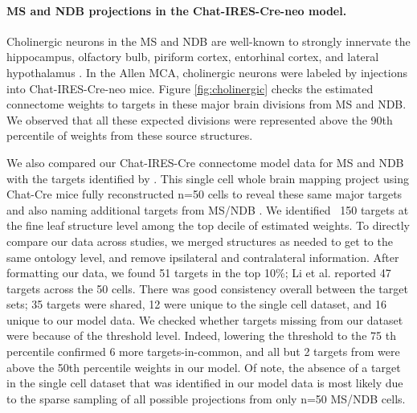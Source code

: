 \paragraph{MS and NDB projections in the Chat-IRES-Cre-neo model.}

Cholinergic neurons in the MS and NDB are well-known to strongly innervate the hippocampus, olfactory bulb, piriform cortex, entorhinal cortex, and lateral hypothalamus \citep{Zaborszky2015-fm, Watson2012TheMN}.
In the Allen MCA, cholinergic neurons were labeled by injections into Chat-IRES-Cre-neo mice.
Figure \ref{fig:cholinergic} checks the estimated connectome weights to targets in these major brain divisions from MS and NDB.
We observed that all these expected divisions were represented above the 90th percentile of weights from these source structures.

We also compared our Chat-IRES-Cre connectome model data for MS and NDB with the targets identified by  \citet{Li2018-nu}.
This single cell whole brain mapping project using Chat-Cre mice fully reconstructed n=50 cells to reveal these same major targets and also naming additional targets from MS/NDB \citep{Li2018-nu}.
We identified ~150 targets at the fine leaf structure level among the top decile of estimated weights.
To directly compare our data across studies, we merged structures as needed to get to the same ontology level, and remove ipsilateral and contralateral information.
After formatting our data, we found 51 targets in the top 10\%; Li et al. reported 47 targets across the 50 cells.
There was good consistency overall between the target sets; 35 targets were shared, 12 were unique to the single cell dataset, and 16 unique to our model data.
We checked whether targets missing from our dataset were because of the threshold level.
Indeed, lowering the threshold to the 75 th percentile confirmed 6 more targets-in-common, and all but 2 targets from \citet{ Li2018-nu} were above the 50th percentile weights in our model.
Of note, the absence of a target in the single cell dataset that was identified in our model data is most likely due to the sparse sampling of all possible projections from only n=50 MS/NDB cells.


